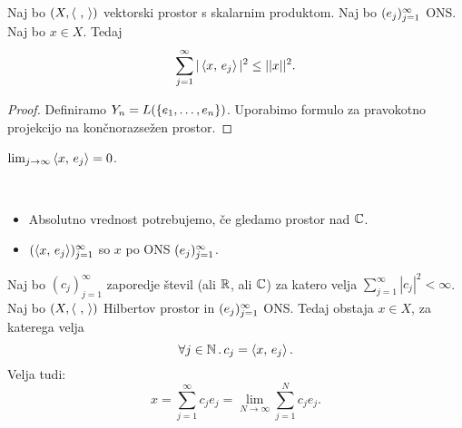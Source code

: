 \begin{trditev}
    Naj bo \((X, \left\langle \ , \,  \right\rangle)\) vektorski prostor s skalarnim produktom. Naj bo \((e_j)_{j=1}^\infty\) ONS. Naj bo \(x \in X\). Tedaj 
    \[\sum_{j=1}^{\infty}|\left\langle x, \, e_j \right\rangle|^2 \leq ||x||^2.\]  
\end{trditev}

\begin{proof}
    Definiramo \(Y_n = L(\left\{e_1, \ldots, e_n\right\})\). Uporabimo formulo za pravokotno projekcijo na končnorazsežen prostor.
\end{proof}

\begin{posledica}
    \(\lim_{j \to \infty} \left\langle x, \, e_j \right\rangle = 0\).
\end{posledica}

\begin{opomba} \
    \begin{itemize}
        \item Absolutno vrednost potrebujemo, če gledamo prostor nad \(\mathbb{C}\).
        \item \((\left\langle x, \, e_j \right\rangle)_{j = 1}^\infty\) so  \(x\) po ONS \((e_j)_{j=1}^\infty\).
    \end{itemize}
\end{opomba}

\begin{trditev}
    Naj bo \((c_j)_{j=1}^\infty\) zaporedje števil (ali \(\mathbb{R}\), ali \(\mathbb{C}\)) za katero velja \(\sum_{j=1}^{\infty} |c_j|^2 < \infty\). Naj bo \((X, \left\langle \ , \,  \right\rangle)\) Hilbertov prostor in \((e_j)_{j=1}^\infty\) ONS. Tedaj obstaja \(x \in X\), za katerega velja 
    \[\forall j \in \mathbb{N} \,.\, c_j = \left\langle x, \, e_j \right\rangle.\]
    Velja tudi:
    \[x = \sum_{j = 1}^{\infty}c_je_j = \lim_{N \to \infty} \sum_{j=1}^{N}c_je_j.\]
\end{trditev}
